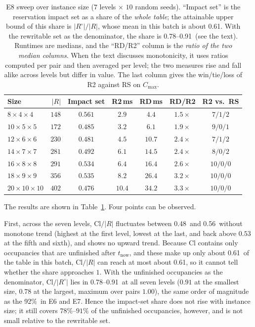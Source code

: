 \documentclass[manuscript,screen,review]{acmart}
\newcommand{\NSeeds}{10}
\newcommand{\ClosureAliveFrac}{92\%}
\newcommand{\ScaleKs}{7}
\newcommand{\ScaleCloLo}{0.48}       %
\newcommand{\ScaleCloHi}{0.56}       %
\newcommand{\ScaleAliveShare}{0.61}  %
\newcommand{\ScaleCloAliveLo}{0.78}  %
\newcommand{\ScaleCloAliveHi}{0.91}  %
\begin{document}
\begin{table}[t]
\centering
\caption{E8 sweep over instance size (\(\ScaleKs\) levels \(\times\) \(\NSeeds\) random seeds).
``Impact set'' is the reservation impact set as a share of the \emph{whole table}; the attainable upper bound of this share is \(|R^{\circ}|/|R|\), whose mean in this batch is about
\ScaleAliveShare. With the rewritable set as the denominator, the share is \ScaleCloAliveLo--\ScaleCloAliveHi\ (see the text).
Runtimes are medians, and the ``RD/R2'' column is the \emph{ratio of the two median columns}. When the text discusses monotonicity, it uses ratios computed per pair and then averaged per level;
the two measures rise and fall alike across levels but differ in value. The last column gives the win/tie/loss of R2 against RS on \(C_{\max}\).}
\label{tab:instscale}
\small
\begin{tabular}{@{}lrccccc@{}}
\toprule
Size & \(|R|\) & Impact set & R2\,ms & RD\,ms & RD/R2 & R2 vs.\ RS \\
\midrule
\(8\times4\times4\)    & \(148\) & \(0.561\) & \(2.9\)  & \(4.4\)  & \(1.5\times\) & \(7/1/2\) \\
\(10\times5\times5\)   & \(172\) & \(0.485\) & \(3.2\)  & \(6.1\)  & \(1.9\times\) & \(9/0/1\) \\
\(12\times6\times6\)   & \(230\) & \(0.481\) & \(4.5\)  & \(10.7\) & \(2.4\times\) & \(7/1/2\) \\
\(14\times7\times7\)   & \(281\) & \(0.492\) & \(6.1\)  & \(14.5\) & \(2.4\times\) & \(8/0/2\) \\
\(16\times8\times8\)   & \(291\) & \(0.534\) & \(6.4\)  & \(16.4\) & \(2.6\times\) & \(10/0/0\) \\
\(18\times9\times9\)   & \(356\) & \(0.535\) & \(8.2\)  & \(26.4\) & \(3.2\times\) & \(10/0/0\) \\
\(20\times10\times10\) & \(402\) & \(0.476\) & \(10.4\) & \(34.2\) & \(3.3\times\) & \(10/0/0\) \\
\bottomrule
\end{tabular}
\end{table}

The results are shown in Table~\ref{tab:instscale}. Four points can be observed.

First, across the seven levels, \(\mathrm{Cl}/|R|\) fluctuates between \ScaleCloLo\ and \ScaleCloHi\ without monotone trend
(highest at the first level, lowest at the last, and back above \(0.53\) at the fifth and sixth), and shows no upward trend. Because \(\mathrm{Cl}\) contains only
occupancies that are unfinished after \(t_{\mathrm{now}}\), and these make up only about \ScaleAliveShare\ of the table in this batch,
\(\mathrm{Cl}/|R|\) can reach at most about \ScaleAliveShare, so it cannot tell whether the share approaches \(1\).
With the unfinished occupancies as the denominator, \(\mathrm{Cl}/|R^{\circ}|\) lies in \ScaleCloAliveLo--\ScaleCloAliveHi\ at all seven levels
(\(0.91\) at the smallest size, \(0.78\) at the largest, maximum over pairs \(1.00\)), the same order of magnitude as the \ClosureAliveFrac\ in E6 and E7.
Hence the impact-set share does not rise with instance size; it still covers \(78\%\)--\(91\%\) of the unfinished occupancies, however, and is not small relative to the rewritable set.
\end{document}
